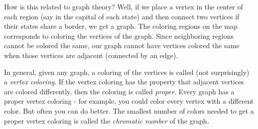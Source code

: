 \documentclass[12pt]{article}
\begin{document}
How is this related to graph theory?  Well, if we place a vertex in the center of each region (say in the capital of each state) and then connect two vertices if their states share a border, we get a graph.  The coloring regions on the map corresponds to coloring the vertices of the graph.  Since neighboring regions cannot be colored the same, our graph cannot have vertices colored the same when those vertices are adjacent (connected by an edge).

In general, given any graph, a coloring of the vertices is called (not surprisingly) a {\em vertex coloring}.  If the vertex coloring has the property that adjacent vertices are colored differently, then the coloring is called {\em proper}.  Every graph has a proper vertex coloring - for example, you could color every vertex with a different color.  But often you can do better.  The smallest number of colors needed to get a proper vertex coloring is called the {\em chromatic number} of the graph.
\end{document}
